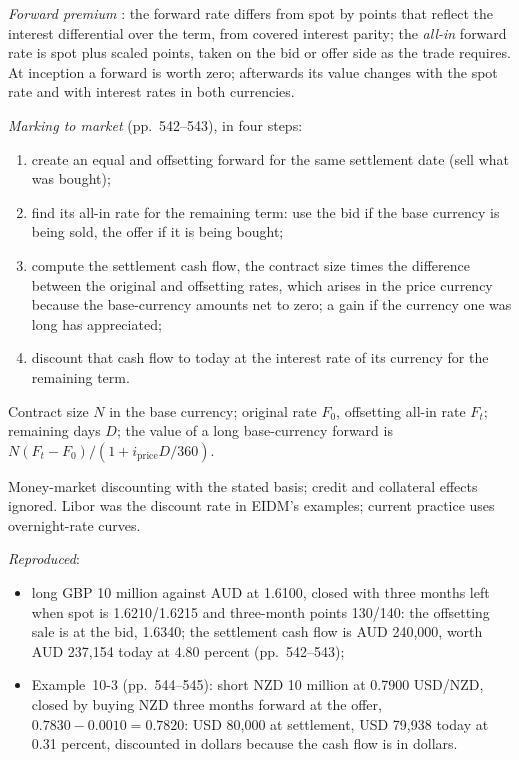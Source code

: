 \begin{qfmethod}\label{meth:currency-forward-mark-to-market}
 \emph{Forward premium} \citep[chap.~10, sec.~2.2, pp.~538--542]{economics-investment-decision-makers-2013}: the forward rate differs from spot by points that reflect the interest differential over the term, from covered interest parity; the \emph{all-in} forward rate is spot plus scaled points, taken on the bid or offer side as the trade requires. At inception a forward is worth zero; afterwards its value changes with the spot rate and with interest rates in both currencies.

\emph{Marking to market} (pp.~542--543), in four steps:
\begin{enumerate}
\item create an equal and offsetting forward for the same settlement date (sell what was bought);
\item find its all-in rate for the remaining term: use the bid if the base currency is being sold, the offer if it is being bought;
\item compute the settlement cash flow, the contract size times the difference between the original and offsetting rates, which arises in the price currency because the base-currency amounts net to zero; a gain if the currency one was long has appreciated;
\item discount that cash flow to today at the interest rate of its currency for the remaining term.
\end{enumerate}

 Contract size $N$ in the base currency; original rate $F_0$, offsetting all-in rate $F_t$; remaining days $D$; the value of a long base-currency forward is $N(F_t-F_0)/(1+i_{\text{price}}D/360)$.

 Money-market discounting with the stated basis; credit and collateral effects ignored. Libor was the discount rate in EIDM's examples; current practice uses overnight-rate curves.

 \emph{Reproduced}:
\begin{itemize}
\item long GBP 10 million against AUD at 1.6100, closed with three months left when spot is 1.6210/1.6215 and three-month points 130/140: the offsetting sale is at the bid, 1.6340; the settlement cash flow is AUD 240{,}000, worth AUD 237{,}154 today at 4.80 percent (pp.~542--543);
\item Example~10-3 (pp.~544--545): short NZD 10 million at 0.7900 USD/NZD, closed by buying NZD three months forward at the offer, $0.7830-0.0010=0.7820$: USD 80{,}000 at settlement, USD 79{,}938 today at 0.31 percent, discounted in dollars because the cash flow is in dollars.
\end{itemize}


\end{qfmethod}
